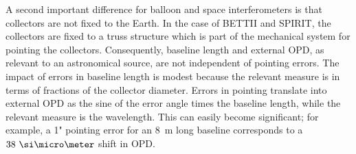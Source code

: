 
A second important difference for balloon and space interferometers is that collectors are not fixed
to the Earth. In the case of BETTII and SPIRIT, the collectors are fixed to a truss structure which
is part of the mechanical system for pointing the collectors. Consequently, baseline length
and external OPD, as relevant to an astronomical source, are not independent of pointing errors. The impact of errors in baseline length is modest because the relevant measure is in terms of fractions of the collector diameter. Errors in pointing translate into external OPD as the sine of the error angle times the baseline length, while the relevant measure is the wavelength. This can easily become significant;
for example, a 1" pointing error for an 8~m long baseline corresponds to a $38~\um$ shift in OPD.

